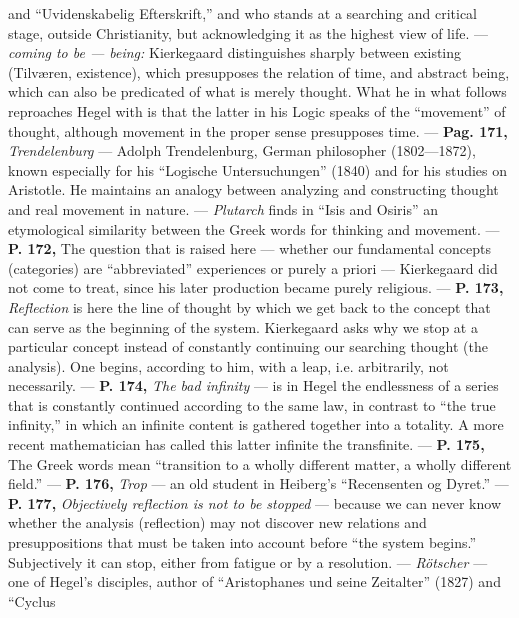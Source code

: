 \documentclass[12pt,a4paper,openany]{book}
\begin{document}
and ``Uvidenskabelig Efterskrift,'' and who stands at a searching and critical
stage, outside Christianity, but acknowledging it as the highest
view of life. --- \textit{coming to be --- being:} Kierkegaard distinguishes sharply between
existing (Tilværen, existence), which presupposes the relation of time, and abstract being,
which can also be predicated of what is merely thought. What he in what follows
reproaches Hegel with is that the latter in his Logic speaks of the ``movement'' of thought,
although movement in the proper sense presupposes time. --- \textbf{Pag. 171,} \textit{Trendelenburg}
--- Adolph Trendelenburg, German philosopher (1802—1872), known especially
for his ``Logische Untersuchungen'' (1840) and for his studies on
Aristotle. He maintains an analogy between analyzing and constructing
thought and real movement in nature. --- \textit{Plutarch} finds in
``Isis and Osiris'' an etymological similarity between the Greek words for thinking
and movement. --- \textbf{P. 172,} The question that is raised here ---
whether our fundamental concepts (categories) are ``abbreviated'' experiences or purely
a priori --- Kierkegaard did not come to treat, since his later
production became purely religious. --- \textbf{P. 173,} \textit{Reflection} is here the line of thought
by which we get back to the concept that can serve as the beginning
of the system. Kierkegaard asks why we stop at a
particular concept instead of constantly continuing our searching thought (the analysis).
One begins, according to him, with a leap, i.e. arbitrarily, not
necessarily. --- \textbf{P. 174,} \textit{The bad infinity} --- is in Hegel the endlessness
of a series that is constantly continued according to the same law, in contrast
to ``the true infinity,'' in which an infinite content is gathered together
into a totality. A more recent mathematician has called this latter infinite
the transfinite. --- \textbf{P. 175,} The Greek words mean ``transition to a wholly
different matter, a wholly different field.'' --- \textbf{P. 176,} \textit{Trop} --- an old
student in Heiberg's ``Recensenten og Dyret.'' --- \textbf{P. 177,} \textit{Objectively
reflection is not to be stopped} --- because we can never know whether the analysis
(reflection) may not discover new relations and presuppositions that must
be taken into account before ``the system begins.'' Subjectively it can stop, %
either from fatigue or by a resolution. --- \textit{Rötscher} --- one of Hegel's
disciples, author of ``Aristophanes und seine Zeitalter'' (1827) and ``Cyclus
\end{document}
